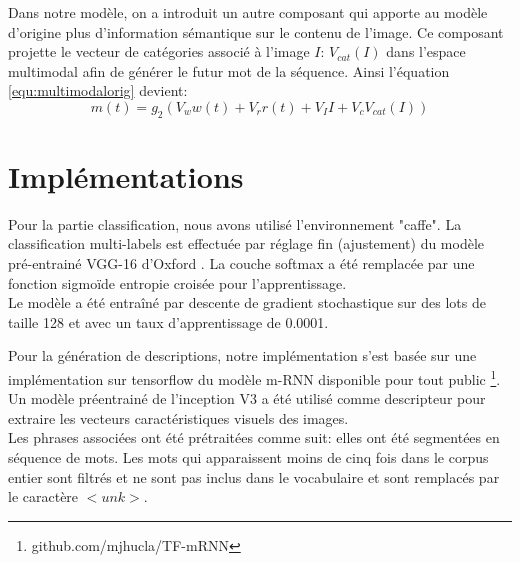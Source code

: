 Dans notre modèle, on a introduit un autre composant qui apporte au modèle d'origine plus d'information sémantique sur le contenu de l'image. Ce composant projette le vecteur de catégories associé à l'image $I$: $V_{cat}(I)$ dans l'espace multimodal  afin de générer le futur mot  de la séquence. Ainsi l'équation \ref{equ:multimodalorig} devient: 
\begin{equation}
\label{equ:multimodalcontr}
m(t) = g_2(V_w w(t)+V_r r(t)+ V_I I + V_c V_{cat}(I))
\end{equation}

\section{Implémentations} \label{implementation}

Pour la partie classification, nous avons utilisé l'environnement  "caffe"\cite{jia2014caffe}. La classification multi-labels est effectuée par réglage fin (ajustement) du modèle pré-entrainé VGG-16 d'Oxford \cite{simonyan2014very}. La couche softmax a été remplacée par une fonction sigmoïde entropie croisée pour l'apprentissage.\\
Le modèle a été entraîné par descente de gradient stochastique sur des lots de taille 128 et avec un taux d'apprentissage de 0.0001.

Pour la génération de descriptions, notre implémentation s'est basée sur une implémentation sur tensorflow \cite{abadi2016tensorflow} du modèle m-RNN disponible pour tout public \footnote{github.com/mjhucla/TF-mRNN}. Un modèle préentrainé de l'inception V3 a été utilisé comme descripteur pour extraire les vecteurs caractéristiques visuels des images. \\
Les phrases associées ont été prétraitées comme suit:  elles ont été segmentées en séquence de mots. Les mots qui apparaissent moins de cinq fois dans le corpus entier sont filtrés et ne sont pas inclus dans le vocabulaire et sont remplacés par le caractère  $<unk>$.

